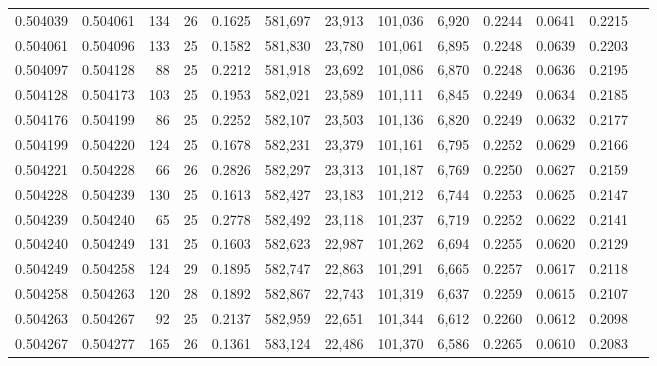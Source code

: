 \begin{tabular}{rrrrrrrrrrrrr}
0.504039 & 0.504061 & 134 &  26 &                                     0.1625 & 581,697 &  23,913 & 101,036 &   6,920 & 0.2244 & 0.0641 & 0.2215 \\
0.504061 & 0.504096 & 133 &  25 &                                     0.1582 & 581,830 &  23,780 & 101,061 &   6,895 & 0.2248 & 0.0639 & 0.2203 \\
0.504097 & 0.504128 &  88 &  25 &                                     0.2212 & 581,918 &  23,692 & 101,086 &   6,870 & 0.2248 & 0.0636 & 0.2195 \\
0.504128 & 0.504173 & 103 &  25 &                                     0.1953 & 582,021 &  23,589 & 101,111 &   6,845 & 0.2249 & 0.0634 & 0.2185 \\
0.504176 & 0.504199 &  86 &  25 &                                     0.2252 & 582,107 &  23,503 & 101,136 &   6,820 & 0.2249 & 0.0632 & 0.2177 \\
0.504199 & 0.504220 & 124 &  25 &                                     0.1678 & 582,231 &  23,379 & 101,161 &   6,795 & 0.2252 & 0.0629 & 0.2166 \\
0.504221 & 0.504228 &  66 &  26 &                                     0.2826 & 582,297 &  23,313 & 101,187 &   6,769 & 0.2250 & 0.0627 & 0.2159 \\
0.504228 & 0.504239 & 130 &  25 &                                     0.1613 & 582,427 &  23,183 & 101,212 &   6,744 & 0.2253 & 0.0625 & 0.2147 \\
0.504239 & 0.504240 &  65 &  25 &                                     0.2778 & 582,492 &  23,118 & 101,237 &   6,719 & 0.2252 & 0.0622 & 0.2141 \\
0.504240 & 0.504249 & 131 &  25 &                                     0.1603 & 582,623 &  22,987 & 101,262 &   6,694 & 0.2255 & 0.0620 & 0.2129 \\
0.504249 & 0.504258 & 124 &  29 &                                     0.1895 & 582,747 &  22,863 & 101,291 &   6,665 & 0.2257 & 0.0617 & 0.2118 \\
0.504258 & 0.504263 & 120 &  28 &                                     0.1892 & 582,867 &  22,743 & 101,319 &   6,637 & 0.2259 & 0.0615 & 0.2107 \\
0.504263 & 0.504267 &  92 &  25 &                                     0.2137 & 582,959 &  22,651 & 101,344 &   6,612 & 0.2260 & 0.0612 & 0.2098 \\
0.504267 & 0.504277 & 165 &  26 &                                     0.1361 & 583,124 &  22,486 & 101,370 &   6,586 & 0.2265 & 0.0610 & 0.2083 \\

\end{tabular}
